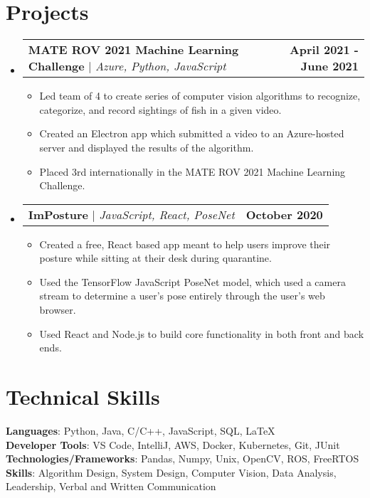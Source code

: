 \documentclass[letterpaper,11pt]{article}
\makeatletter
\newcommand{\resumeItem}[1]{
  \item\small{
    {#1 \vspace{-2pt}}
  }
}
\newcommand{\resumeProjectHeading}[2]{
    \item
    \begin{tabular*}{1.001\textwidth}{l@{\extracolsep{\fill}}r}
      \small#1 & \textbf{\small #2}\\
    \end{tabular*}\vspace{-7pt}
}
\newcommand{\resumeSubHeadingListStart}{\begin{itemize}[leftmargin=0.0in, label={}]}
\newcommand{\resumeSubHeadingListEnd}{\end{itemize}}
\newcommand{\resumeItemListStart}{\begin{itemize}}
\newcommand{\resumeItemListEnd}{\end{itemize}\vspace{-5pt}}
\makeatother
\begin{document}
\section{Projects}
    \vspace{-5pt}
    \resumeSubHeadingListStart
      \resumeProjectHeading
        {\textbf{MATE ROV 2021 Machine Learning Challenge} $|$
              \emph{Azure, Python, JavaScript}}{April 2021 - June 2021}
        \resumeItemListStart
          \resumeItem{Led team of 4 to create series of computer vision algorithms to recognize,
                      categorize, and record sightings of fish in a given video.}
          \resumeItem{Created an Electron app which submitted a video to an Azure-hosted server
                      and displayed the results of the algorithm.}
          \resumeItem{Placed 3rd internationally in the MATE ROV 2021 Machine Learning Challenge.}
        \resumeItemListEnd
        \vspace{-13pt}
      \resumeProjectHeading
          {\textbf{ImPosture} $|$ \emph{JavaScript, React, PoseNet}}{October 2020}
          \resumeItemListStart
            \resumeItem{Created a free, React based app meant to help users improve their posture
                        while sitting at their desk during quarantine.}
            \resumeItem{Used the TensorFlow JavaScript PoseNet model, which used a camera
                        stream to determine a user's pose entirely through the user's web browser.}
            \resumeItem{Used React and Node.js to build core functionality in both front and back ends.}
          \resumeItemListEnd
          \vspace{-13pt}
    \resumeSubHeadingListEnd
\vspace{-15pt}


%
\section{Technical Skills}
 \begin{itemize}[leftmargin=0.15in, label={}]
    \small{\item{
     \textbf{Languages}{: Python, Java, C/C++, JavaScript, SQL, \LaTeX} \\
     \textbf{Developer Tools}{: VS Code, IntelliJ, AWS, Docker, Kubernetes, Git, JUnit} \\
     \textbf{Technologies/Frameworks}{: Pandas, Numpy, Unix, OpenCV, ROS, FreeRTOS} \\
     \textbf{Skills}{: Algorithm Design, System Design, Computer Vision, Data Analysis, Leadership, Verbal and Written Communication}\\
    }}
 \end{itemize}
 \vspace{-16pt}
\end{document}
